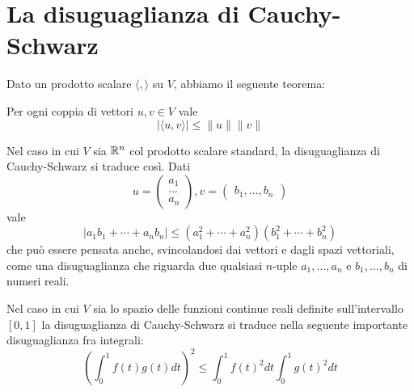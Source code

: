 \section{La disuguaglianza di Cauchy-Schwarz}
Dato un prodotto scalare $\langle , \rangle$ su $V$, abbiamo il seguente
teorema:

\begin{theorem}
	Per ogni coppia di vettori $u, v \in V$ vale
	\[
		|\langle u, v \rangle| \leq \| u \| \| v \|
	\]
\end{theorem}

\begin{example}
	Nel caso in cui $V$ sia $\mathbb{R}^n$ col prodotto scalare standard, la
	disuguaglianza di Cauchy-Schwarz si traduce così. Dati
	\[
		u = \begin{pmatrix}
			a_1 \\ \dots \\ a_n
		\end{pmatrix},
		v = \begin{pmatrix}
			b_1, \dots, b_n
		\end{pmatrix}
	\]
	vale
	\[
		|a_1 b_1 + \cdots + a_n b_n| \leq
		(a_1^2 + \cdots + a_n^2)(b_1^2 + \cdots + b_n^2)
	\]
	che può essere pensata anche, svincolandosi dai vettori e dagli spazi
	vettoriali, come una disuguaglianza che riguarda due qualsiasi $n$-uple
	$a_1, \dots, a_n$ e $b_1, \dots, b_n$ di numeri reali.
\end{example}

\begin{example}
	Nel caso in cui $V$ sia lo spazio delle funzioni continue reali definite
	sull'intervallo $[0, 1]$ la disuguaglianza di Cauchy-Schwarz si traduce
	nella seguente importante disuguaglianza fra integrali:
	\[
		\left( \int_0^1 f(t)g(t)dt \right)^2 \leq
		\int_0^1 f(t)^2 dt \int_0^1 g(t)^2 dt
	\]
\end{example}

